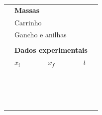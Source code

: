 \begin{table}[!ht]
\centering
\begin{tabular}{lp{25mm}p{25mm}p{25mm}l}
\toprule
	& \multicolumn{3}{l}{\textbf{Massas}} \\
	\cmidrule{2-4}
	& \multicolumn{2}{l}{Carrinho \cellcolor[gray]{0.89}} & \cellcolor[gray]{0.92} \\
	& \multicolumn{2}{l}{Gancho e anilhas \cellcolor[gray]{0.95}} & \cellcolor[gray]{0.97}\\
	\cmidrule{2-4}
\\
	&\multicolumn{3}{l}{\textbf{Dados experimentais}} \\
	\cmidrule{2-4}
	& $x_i$ & $x_f$ & $t$ & \\
	\cmidrule{2-4}
	& \cellcolor[gray]{0.89} & \cellcolor[gray]{0.92} & \cellcolor[gray]{0.89} \\
	& \cellcolor[gray]{0.95} & \cellcolor[gray]{0.97} & \cellcolor[gray]{0.95} \\
	& \cellcolor[gray]{0.89} & \cellcolor[gray]{0.92} & \cellcolor[gray]{0.89} \\
	& \cellcolor[gray]{0.95} & \cellcolor[gray]{0.97} & \cellcolor[gray]{0.95} \\
	& \cellcolor[gray]{0.89} & \cellcolor[gray]{0.92} & \cellcolor[gray]{0.89} \\
	& \cellcolor[gray]{0.95} & \cellcolor[gray]{0.97} & \cellcolor[gray]{0.95} \\
	& \cellcolor[gray]{0.89} & \cellcolor[gray]{0.92} & \cellcolor[gray]{0.89} \\
	& \cellcolor[gray]{0.95} & \cellcolor[gray]{0.97} & \cellcolor[gray]{0.95} \\
	& \cellcolor[gray]{0.89} & \cellcolor[gray]{0.92} & \cellcolor[gray]{0.89} \\
	& \cellcolor[gray]{0.95} & \cellcolor[gray]{0.97} & \cellcolor[gray]{0.95} \\
	& \cellcolor[gray]{0.89} & \cellcolor[gray]{0.92} & \cellcolor[gray]{0.89} \\
	& \cellcolor[gray]{0.95} & \cellcolor[gray]{0.97} & \cellcolor[gray]{0.95} \\
	& \cellcolor[gray]{0.89} & \cellcolor[gray]{0.92} & \cellcolor[gray]{0.89} \\
	& \cellcolor[gray]{0.95} & \cellcolor[gray]{0.97} & \cellcolor[gray]{0.95} \\
	& \cellcolor[gray]{0.89} & \cellcolor[gray]{0.92} & \cellcolor[gray]{0.89} \\
	& \cellcolor[gray]{0.95} & \cellcolor[gray]{0.97} & \cellcolor[gray]{0.95} \\

\end{tabular}
\end{table}
